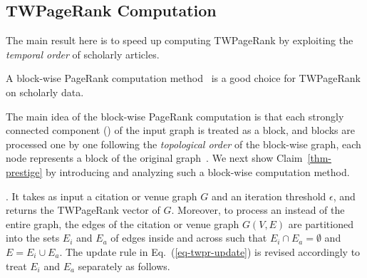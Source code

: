 



\subsection{TWPageRank Computation}
\label{subsec-TWPageRank-computation}

The main result here is to speed up computing TWPageRank by exploiting the {\em temporal order} of scholarly articles.


\begin{claim}
\label{thm-prestige}
A block-wise PageRank computation method~\cite{Berkhin05} is a good choice for TWPageRank on scholarly data.
\end{claim}

The main idea of the block-wise PageRank computation is that each strongly connected component (\scc) of the input graph is treated as a block, and blocks are processed one by one following the {\em topological order} of the block-wise graph, \ie each node represents a block of the original graph~\cite{Berkhin05}.
We next show Claim~\ref{thm-prestige} by introducing and analyzing such a block-wise computation method.




.  It takes as input a citation or venue graph $G$ and an iteration threshold $\epsilon$, and returns the TWPageRank vector of $G$.
Moreover, to process an \scc instead of the entire graph, the edges of the citation or venue graph $G(V, E)$ are partitioned into the sets $E_i$ and $E_a$ of edges inside and across \sccs  such that $E_i\cap E_a = \emptyset$ and $E = E_i \cup E_a$.  The update rule in Eq.~(\ref{eq-twpr-update})  is revised accordingly to treat $E_i$ and $E_a$ separately as follows.


